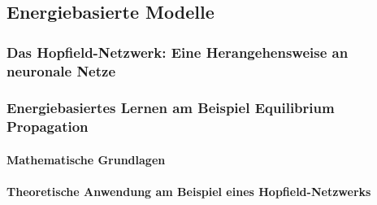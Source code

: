 \subsection{Energiebasierte Modelle}



\subsubsection{Das Hopfield-Netzwerk: Eine Herangehensweise an neuronale Netze}

\subsubsection{Energiebasiertes Lernen am Beispiel Equilibrium Propagation}

\paragraph{Mathematische Grundlagen}

\paragraph{Theoretische Anwendung am Beispiel eines Hopfield-Netzwerks}
